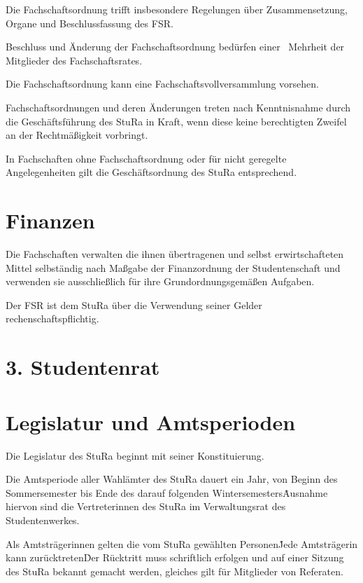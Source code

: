 \begin{multicols}{2}
\Abs \Satz Die Fachschaftsordnung trifft insbesondere Regelungen über Zusammensetzung, Organe und Beschlussfassung des FSR.

\Abs \Satz Beschluss und Änderung der Fachschaftsordnung bedürfen einer ~Mehrheit der Mitglieder des Fachschaftsrates.

\Abs \Satz Die Fachschaftsordnung kann eine Fachschaftsvollversammlung vorsehen.

\Abs \Satz Fachschaftsordnungen und deren Änderungen treten nach Kenntnisnahme durch die Geschäftsführung des StuRa in Kraft, wenn diese keine berechtigten Zweifel an der Rechtmäßigkeit vorbringt.

\Abs \Satz In Fachschaften ohne Fachschaftsordnung oder für nicht geregelte Angelegenheiten gilt die Geschäftsordnung des StuRa entsprechend.



\section{Finanzen}

\Abs \Satz Die Fachschaften verwalten die ihnen übertragenen und selbst erwirtschafteten Mittel selbständig nach Maßgabe der Finanzordnung der Studentenschaft und verwenden sie ausschließlich für ihre Grundordnungsgemäßen Aufgaben.

\Abs \Satz Der FSR ist dem StuRa über die Verwendung seiner Gelder rechenschaftspflichtig.


\section*{3. Studentenrat}



\section{Legislatur und Amtsperioden}

\Abs \Satz Die Legislatur des StuRa beginnt mit seiner Konstituierung.

\Abs \Satz Die Amtsperiode aller Wahlämter des StuRa dauert ein Jahr, von Beginn des Sommersemester bis Ende des darauf folgenden Wintersemesters\. Ausnahme hiervon sind die Vertreterinnen des StuRa im Verwaltungsrat des Studentenwerkes.

\Abs \Satz Als Amtsträgerinnen gelten die vom StuRa gewählten Personen\. Jede Amtsträgerin kann zurücktreten\. Der Rücktritt muss schriftlich erfolgen und auf einer Sitzung des StuRa bekannt gemacht werden, gleiches gilt für Mitglieder von Referaten.


\end{multicols}
